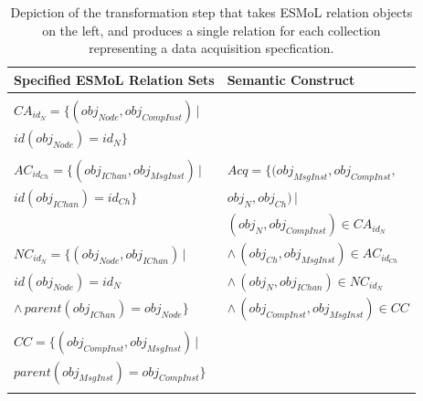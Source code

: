 \begin{table}[ht]
\centering

\begin{tabular}[width=\columnwidth]{ | l | l | }
 \hline
 \textbf{Specified ESMoL Relation Sets} & \textbf{Semantic
Construct} \\
 \hline \hline
                                                                        & \\
 $CA_{id_N} = \{ (obj_{Node}, obj_{CompInst} ) \, |$                    & \\
 \hspace{1.7cm} $ id(obj_{Node}) = id_N \} $                            & \\
                                                                        & \\
 $AC_{id_{Ch}} = \{ (obj_{IChan}, obj_{MsgInst} ) \, |$                 & 
$ Acq = \{(obj_{MsgInst}, obj_{CompInst}, $  \\
 \hspace{1.6cm} $id(obj_{IChan}) = id_{Ch} \} $                         & 
\hspace{1.3cm} $obj_{N}, obj_{Ch}) \, |$ \\
                                                                        &  
\hspace{0.8cm} $(obj_{N}, obj_{CompInst}) \in CA_{id_N}$ \\
 $NC_{id_N} = \{ (obj_{Node}, obj_{IChan}) \, | $                       & 
\hspace{0.5cm} $ \wedge \, (obj_{Ch}, obj_{MsgInst}) \in AC_{id_{Ch}}$ \\
 \hspace{1.35cm} $id(obj_{Node}) = id_N $                                &
\hspace{0.5cm} $ \wedge \, (obj_{N}, obj_{IChan}) \in NC_{id_N}$ \\ 
 \hspace{1cm} $ \wedge \, parent(obj_{IChan} ) = obj_{Node} \}$       &
\hspace{0.5cm} $ \wedge \, (obj_{CompInst}, obj_{MsgInst}) \in CC $ \\
                                                                        & \\
 $CC = \{ (obj_{CompInst}, obj_{MsgInst} ) \, | $                       & \\
 \hspace{0.7cm} $parent(obj_{MsgInst} ) = obj_{CompInst} \}$            & \\ 
                                                                        & \\
 \hline
\end{tabular}
	\caption{Depiction of the transformation step that takes ESMoL
relation objects on the left, and produces a single relation for each
collection representing a data acquisition specfication.}
	\label{tab:acquisition}
\end{table}

